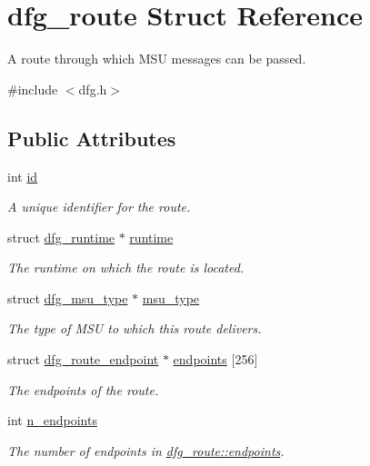 \hypertarget{structdfg__route}{\section{dfg\-\_\-route Struct Reference}
\label{structdfg__route}
}


A route through which M\-S\-U messages can be passed.  




{\ttfamily \#include $<$dfg.\-h$>$}

\subsection*{Public Attributes}
\begin{DoxyCompactItemize}
\item 
int \hyperlink{structdfg__route_aade838574772b19aa4c562f818a04c4a}{id}
\begin{DoxyCompactList}\small\item\em A unique identifier for the route. \end{DoxyCompactList}\item 
struct \hyperlink{structdfg__runtime}{dfg\-\_\-runtime} $\ast$ \hyperlink{structdfg__route_a07ec2a43f3078fc9fe4b8cc1ab0339b3}{runtime}
\begin{DoxyCompactList}\small\item\em The runtime on which the route is located. \end{DoxyCompactList}\item 
struct \hyperlink{structdfg__msu__type}{dfg\-\_\-msu\-\_\-type} $\ast$ \hyperlink{structdfg__route_abfa4b2c8836a5db1b78c1f64c84f7221}{msu\-\_\-type}
\begin{DoxyCompactList}\small\item\em The type of M\-S\-U to which this route delivers. \end{DoxyCompactList}\item 
struct \hyperlink{structdfg__route__endpoint}{dfg\-\_\-route\-\_\-endpoint} $\ast$ \hyperlink{structdfg__route_a6e4febfc25853befadf7dc64de1b7cff}{endpoints} \mbox{[}256\mbox{]}
\begin{DoxyCompactList}\small\item\em The endpoints of the route. \end{DoxyCompactList}\item 
int \hyperlink{structdfg__route_aa8015cd7ca3c4400e88120e0af74fc99}{n\-\_\-endpoints}
\begin{DoxyCompactList}\small\item\em The number of endpoints in \hyperlink{structdfg__route_a6e4febfc25853befadf7dc64de1b7cff}{dfg\-\_\-route\-::endpoints}. \end{DoxyCompactList}\end{DoxyCompactItemize}


